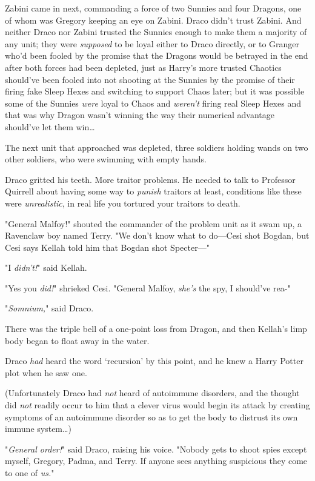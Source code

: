 Zabini came in next, commanding a force of two Sunnies and four Dragons, one of 
whom was Gregory keeping an eye on Zabini. Draco didn't trust Zabini. And 
neither Draco nor Zabini trusted the Sunnies enough to make them a majority of 
any unit; they were \emph{supposed} to be loyal either to Draco directly, or to 
Granger who'd been fooled by the promise that the Dragons would be betrayed in 
the end after both forces had been depleted, just as Harry's more trusted 
Chaotics should've been fooled into not shooting at the Sunnies by the promise 
of their firing fake Sleep Hexes and switching to support Chaos later; but it 
was possible some of the Sunnies \emph{were} loyal to Chaos and \emph{weren't} 
firing real Sleep Hexes and that was why Dragon wasn't winning the way their 
numerical advantage should've let them win{\ldots}

The next unit that approached was depleted, three soldiers holding wands on two 
other soldiers, who were swimming with empty hands.

Draco gritted his teeth. More traitor problems. He needed to talk to Professor 
Quirrell about having some way to \emph{punish} traitors at least, conditions 
like these were \emph{unrealistic}, in real life you tortured your traitors to 
death.

"General Malfoy!" shouted the commander of the problem unit as it swam up, a 
Ravenclaw boy named Terry. "We don't know what to do---Cesi shot Bogdan, but 
Cesi says Kellah told him that Bogdan shot Specter---"

"I \emph{didn't!}" said Kellah.

"Yes you \emph{did!}" shrieked Cesi. "General Malfoy, \emph{she's} the spy, I 
should've rea-"

"\emph{Somnium,}" said Draco.

There was the triple bell of a one-point loss from Dragon, and then Kellah's 
limp body began to float away in the water.

Draco \emph{had} heard the word `recursion' by this point, and he knew a Harry 
Potter plot when he saw one.

(Unfortunately Draco had \emph{not} heard of autoimmune disorders, and the 
thought did \emph{not} readily occur to him that a clever virus would begin its 
attack by creating symptoms of an autoimmune disorder so as to get the body to 
distrust its own immune system{\ldots})

"\emph{General order!}" said Draco, raising his voice. "Nobody gets to shoot 
spies except myself, Gregory, Padma, and Terry. If anyone sees anything 
suspicious they come to one of \emph{us.}"

